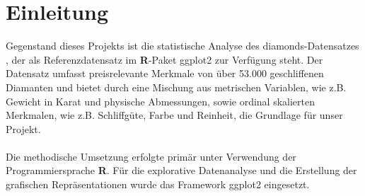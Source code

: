 \section{Einleitung}
Gegenstand dieses Projekts ist die statistische Analyse des diamonds-Datensatzes \cite{noauthor_ggplot2rdatar_nodate}, der als Referenzdatensatz im \textbf{R}-Paket ggplot2 zur Verfügung steht. 
Der Datensatz umfasst preisrelevante Merkmale von über 53.000 geschliffenen Diamanten und bietet durch eine Mischung aus metrischen Variablen, wie z.B. Gewicht in Karat und physische Abmessungen, sowie ordinal skalierten Merkmalen, wie z.B. Schliffgüte, Farbe und Reinheit, die Grundlage für unser Projekt.
\\
\\
Die methodische Umsetzung erfolgte primär unter Verwendung der Programmiersprache \textbf{R}. Für die explorative Datenanalyse und die Erstellung der grafischen Repräsentationen wurde das Framework ggplot2 eingesetzt.